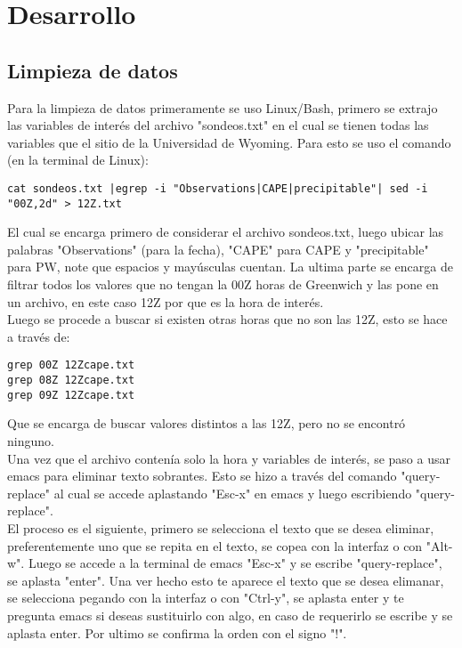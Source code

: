 \documentclass[12pt,letterpaper]{article}
\begin{document}
\section{Desarrollo}

\subsection{Limpieza de datos}

Para la limpieza de datos primeramente se uso Linux/Bash, primero se extrajo las variables de interés del archivo "sondeos.txt" en el cual se tienen todas las variables que el sitio de la Universidad de Wyoming\cite{c}. Para esto se uso el comando (en la terminal de Linux):

\begin{verbatim}
cat sondeos.txt |egrep -i "Observations|CAPE|precipitable"| sed -i "00Z,2d" > 12Z.txt
\end{verbatim}

El cual se encarga primero de considerar el archivo sondeos.txt, luego ubicar las palabras "Observations" (para la fecha), "CAPE" para CAPE y "precipitable" para PW, note que espacios y mayúsculas cuentan. La ultima parte se encarga de filtrar todos los valores que no tengan la 00Z horas de Greenwich y las pone en un archivo, en este caso 12Z por que es la hora de interés.\\

Luego se procede a buscar si existen otras horas que no son las 12Z, esto se hace a través de:

\begin{verbatim}
grep 00Z 12Zcape.txt
grep 08Z 12Zcape.txt
grep 09Z 12Zcape.txt
\end{verbatim}
 
Que se encarga de buscar valores distintos a las 12Z, pero no se encontró ninguno.\\
Una vez que el archivo contenía solo la hora y variables de interés, se paso a usar emacs para eliminar texto sobrantes. Esto se hizo a través del comando "query-replace" al cual se accede aplastando "Esc-x" en emacs y luego escribiendo "query-replace".\\

El proceso es el siguiente, primero se selecciona el texto que se desea eliminar, preferentemente uno que se repita en el texto, se copea con la interfaz o con "Alt-w". Luego se accede a la terminal de emacs "Esc-x" y se escribe "query-replace", se aplasta "enter". Una ver hecho esto te aparece el texto que se desea elimanar, se selecciona pegando con la interfaz o con "Ctrl-y", se aplasta enter y te pregunta emacs si deseas sustituirlo con algo, en caso de requerirlo se escribe y se aplasta enter. Por ultimo se confirma la orden con el signo "!".\\
\end{document}
